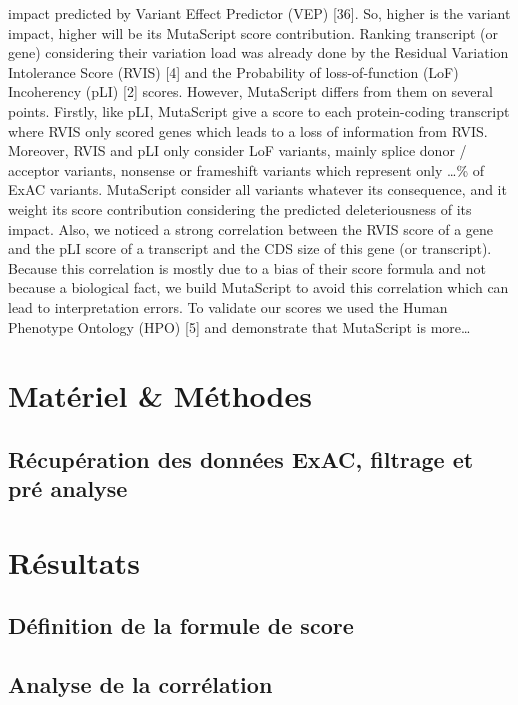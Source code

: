 \documentclass[12pt,twoside]{reedthesis}
\theoremstyle{definition}
\theoremstyle{definition}
\theoremstyle{remark}
\begin{document}
  impact predicted by Variant Effect Predictor (VEP) {[}36{]}. So, higher
  is the variant impact, higher will be its MutaScript score contribution.
  Ranking transcript (or gene) considering their variation load was
  already done by the Residual Variation Intolerance Score (RVIS) {[}4{]}
  and the Probability of loss-of-function (LoF) Incoherency (pLI) {[}2{]}
  scores. However, MutaScript differs from them on several points.
  Firstly, like pLI, MutaScript give a score to each protein-coding
  transcript where RVIS only scored genes which leads to a loss of
  information from RVIS. Moreover, RVIS and pLI only consider LoF
  variants, mainly splice donor / acceptor variants, nonsense or
  frameshift variants which represent only \ldots{}\% of ExAC variants.
  MutaScript consider all variants whatever its consequence, and it weight
  its score contribution considering the predicted deleteriousness of its
  impact. Also, we noticed a strong correlation between the RVIS score of
  a gene and the pLI score of a transcript and the CDS size of this gene
  (or transcript). Because this correlation is mostly due to a bias of
  their score formula and not because a biological fact, we build
  MutaScript to avoid this correlation which can lead to interpretation
  errors. To validate our scores we used the Human Phenotype Ontology
  (HPO) {[}5{]} and demonstrate that MutaScript is more\ldots{}
  
  \section{Matériel \& Méthodes}\label{materiel-methodes}
  
  \subsection{Récupération des données ExAC, filtrage et pré
  analyse}\label{recuperation-des-donnees-exac-filtrage-et-pre-analyse}
  
  \section{Résultats}\label{resultats}
  
  \subsection{Définition de la formule de
  score}\label{definition-de-la-formule-de-score}
  
  \subsection{Analyse de la corrélation}\label{analyse-de-la-correlation}
  
\end{document}

